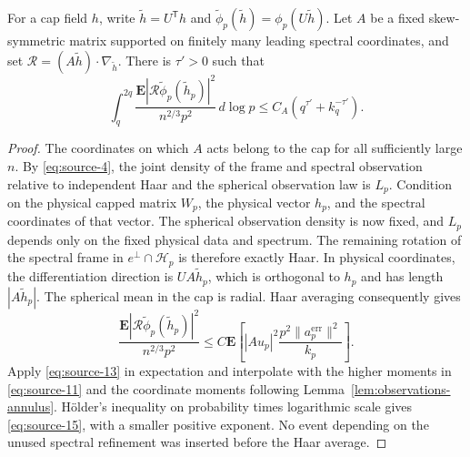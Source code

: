 \begin{lemma}\label{lem:observations-angular}
For a cap field $h$, write $\widetilde h=U^{\mathsf T}h$ and
$\widetilde\phi_p(\widetilde h)=\phi_p(U\widetilde h)$.
Let $A$ be a fixed skew-symmetric matrix supported on finitely many leading
spectral coordinates, and set
$\mathcal R=(A\widetilde h)\cdot\nabla_{\widetilde h}$. There is
$\tau'>0$ such that
\begin{equation}\label{eq:source-15}
 \int_q^{2q}
 \frac{\mathbf E|\mathcal R\widetilde\phi_p(\widetilde h_p)|^2}
      {n^{2/3}p^2}\,d\log p
 \le C_A(q^{\tau'}+k_q^{-\tau'}).
\end{equation}
\end{lemma}

\begin{proof}
The coordinates on which $A$ acts belong to the cap for all sufficiently
large $n$.
By \eqref{eq:source-4}, the joint density of the frame and spectral
observation relative to independent Haar and the spherical observation
law is $L_p$. Condition on the physical capped matrix $W_p$, the physical
vector $h_p$, and the spectral coordinates of that vector. The spherical
observation density is now fixed, and $L_p$ depends only on the fixed
physical data and spectrum. The remaining rotation of the spectral frame
in $e^\perp\cap\mathcal H_p$ is therefore exactly Haar. In physical
coordinates, the differentiation direction is $UA\widetilde h_p$, which
is orthogonal to $h_p$ and has length $|A\widetilde h_p|$. The spherical
mean in the cap is radial. Haar averaging consequently gives
\[
 \frac{\mathbf E|\mathcal R\widetilde\phi_p(\widetilde h_p)|^2}
      {n^{2/3}p^2}
 \le C\mathbf E\left[
 |Au_p|^2\frac{p^2\|a_p^{\mathrm{err}}\|^2}{k_p}\right].
\]
Apply \eqref{eq:source-13} in expectation and interpolate with the higher
moments in \eqref{eq:source-11} and the coordinate moments following
Lemma~\ref{lem:observations-annulus}. H\"older's inequality on probability
times logarithmic scale gives \eqref{eq:source-15}, with a smaller positive
exponent. No event depending on the unused spectral refinement was inserted
before the Haar average.
\end{proof}
